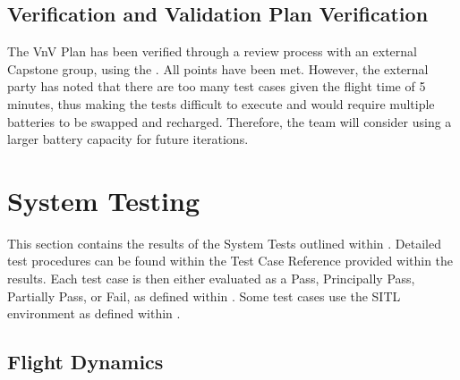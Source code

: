 \documentclass[12pt, titlepage]{article}
\begin{document}
\clearpage

\subsection{Verification and Validation Plan Verification}
\label{subsec:vnvVerification}

The VnV Plan has been verified through a review process with an external Capstone group, using the  . All points have been met. However, the external party has noted that there are too many test cases given the flight time of 5 minutes, thus making the tests difficult to execute and would require multiple batteries to be swapped and recharged. Therefore, the team will consider using a larger battery capacity for future iterations.


\section{System Testing}
\label{sec:SystemTesting}

This section contains the results of the System Tests outlined within . Detailed test procedures can be found within the Test Case Reference provided within the results. Each test case is then either evaluated as a Pass, Principally Pass, Partially Pass, or Fail, as defined within . Some test cases use the SITL environment as defined within .

\subsection{Flight Dynamics}
\end{document}
